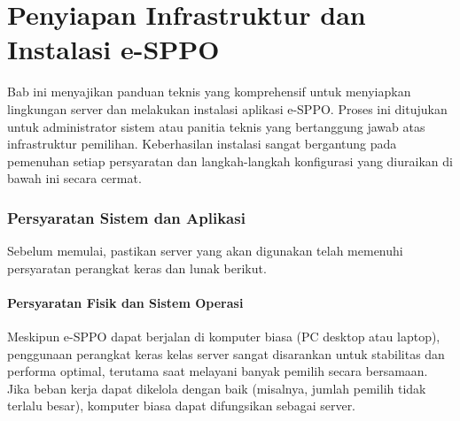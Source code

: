 
\part{Penyiapan Infrastruktur dan Instalasi e-SPPO}
\label{part:penyiapan_sistem}

Bab ini menyajikan panduan teknis yang komprehensif untuk menyiapkan lingkungan server dan melakukan instalasi aplikasi e-SPPO. Proses ini ditujukan untuk administrator sistem atau panitia teknis yang bertanggung jawab atas infrastruktur pemilihan. Keberhasilan instalasi sangat bergantung pada pemenuhan setiap persyaratan dan langkah-langkah konfigurasi yang diuraikan di bawah ini secara cermat.

\section{Persyaratan Sistem dan Aplikasi}
\label{sec:persyaratan_sistem}
Sebelum memulai, pastikan server yang akan digunakan telah memenuhi persyaratan perangkat keras dan lunak berikut.

\subsection{Persyaratan Fisik dan Sistem Operasi}
Meskipun e-SPPO dapat berjalan di komputer biasa (PC desktop atau laptop), penggunaan perangkat keras kelas server sangat disarankan untuk stabilitas dan performa optimal, terutama saat melayani banyak pemilih secara bersamaan. Jika beban kerja dapat dikelola dengan baik (misalnya, jumlah pemilih tidak terlalu besar), komputer biasa dapat difungsikan sebagai server.


